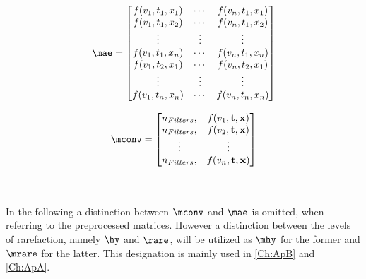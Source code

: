 \begin{minipage}{.55\linewidth}
	\begin{equation}
	\mae = \begin{bmatrix}
	f(v_1,t_1,x_1)&\cdots &f(v_n,t_1,x_1) \\
	f(v_1,t_1,x_2)&\cdots &f(v_n,t_1,x_2) \\
	\vdots& \vdots & \vdots\\
	f(v_1,t_1,x_n)&\cdots &f(v_n,t_1,x_n)\\
	f(v_1,t_2,x_1)&\cdots &f(v_n,t_2,x_1)\\
	\vdots & \vdots & \vdots\\
	f(v_1,t_n,x_n)&\cdots &f(v_n,t_n,x_n)
	\end{bmatrix}
	\label{Eq:AE_matrix}
	\end{equation}
\end{minipage}%
\begin{minipage}{.45\linewidth}
	\begin{equation}
	\mconv= \begin{bmatrix}
	n_{Filters},&f(v_1,\textbf{t},\textbf{x})\\
	n_{Filters},&f(v_2,\textbf{t},\textbf{x})\\
	\vdots&\vdots\\
	n_{Filters},&f(v_n,\textbf{t},\textbf{x})
	\end{bmatrix}
	\label{Eq:CNN_matrix}
	\end{equation}
\end{minipage}\\\\
In the following a distinction between \(\mconv\) and \(\mae\) is omitted, when referring to the preprocessed matrices. However a distinction between the levels of rarefaction, namely \(\hy\) and \(\rare\), will be utilized as \(\mhy\) for the former and \(\mrare\) for the latter. This designation is mainly used in \cref{Ch:ApB} and \cref{Ch:ApA}.
